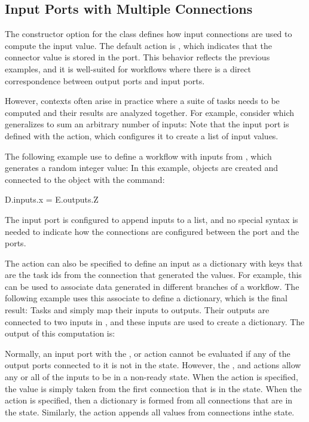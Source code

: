 \subsection{Input Ports with Multiple Connections}

\label{sec:multi-input}

The  constructor option for the  class
defines how input connections are used to compute the input value.
The default action is , which indicates that the connector
value is stored in the port.  This behavior reflects the previous
examples, and it is well-suited for workflows where there is a
direct correspondence between output ports and input ports.

However, contexts often arise in practice where a suite of tasks
needs to be computed and their results are analyzed together.  For
example, consider  which generalizes  to
sum an arbitrary number of inputs:
Note that the input port  is defined with the 
action, which configures it to create a list of input values.

The following example use  to define a workflow with
inputs from , which generates a random integer value:
In this example,  objects are created and connected to
the  object with the command:
\begin{qlisting}
D.inputs.x = E.outputs.Z
\end{qlisting}
The input  port is configured to append inputs to a list,
and no special syntax is needed to indicate how the connections are
configured between the  port and the  ports.

The  action can also be specified to define an input as
a dictionary with keys that are the task ids from the connection
that generated the values.  For example, this can be used to associate
data generated in different branches of a workflow.  The following
example uses this associate to define a dictionary, which is the
final result:
Tasks  and  simply map their inputs to
outputs.  Their outputs are connected to two inputs in ,
and these inputs are used to create a dictionary.  The output of
this computation is:

Normally, an input port with the ,  or
 action cannot be evaluated if any of the output ports
connected to it is not in the  state.  However, the
,  and  actions allow
any or all of the inputs to be in a non-ready state.  When the  action 
is specified, the value is simply taken from the first connection that is in the
 state.  When the  action is specified, then a dictionary is formed
from all connections that are in the  state.  Similarly, the  action
appends all values from connections inthe  state.


